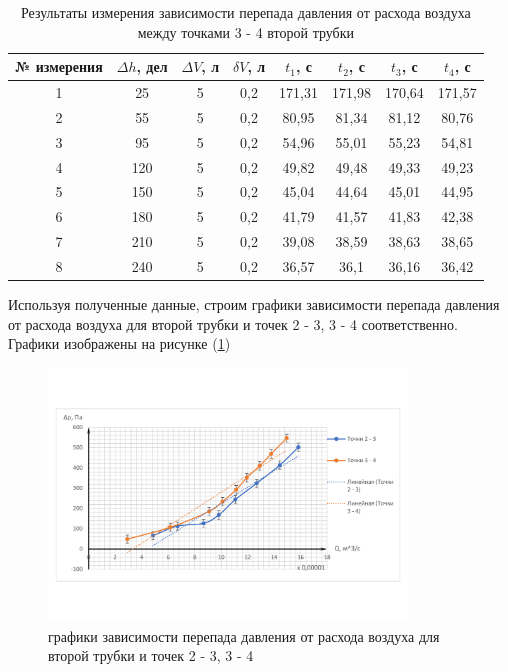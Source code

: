 \documentclass[12pt,a4paper]{article}
\begin{document}
\begin{table}[h!]
\centering
\begin{tabular}{|c|c|c|c|c|c|c|c|}
\hline
№ измерения & $\Delta h$, дел & $\Delta V$, л & $\delta V$, л & $t_{1}$, с & $t_{2}$, с & $t_{3}$, с & $t_{4}$, с \\ \hline
1           & 25              & 5             & 0,2           & 171,31     & 171,98     & 170,64     & 171,57     \\ \hline
2           & 55              & 5             & 0,2           & 80,95      & 81,34      & 81,12      & 80,76      \\ \hline
3           & 95              & 5             & 0,2           & 54,96      & 55,01      & 55,23      & 54,81      \\ \hline
4           & 120             & 5             & 0,2           & 49,82      & 49,48      & 49,33      & 49,23      \\ \hline
5           & 150             & 5             & 0,2           & 45,04      & 44,64      & 45,01      & 44,95      \\ \hline
6           & 180             & 5             & 0,2           & 41,79      & 41,57      & 41,83      & 42,38      \\ \hline
7           & 210             & 5             & 0,2           & 39,08      & 38,59      & 38,63      & 38,65      \\ \hline
8           & 240             & 5             & 0,2           & 36,57      & 36,1       & 36,16      & 36,42      \\ \hline
\end{tabular}
\caption{Результаты измерения зависимости перепада давления от расхода воздуха между точками 3 - 4 второй трубки}
\label{tab:flow_measuring_3_4_second_tube}
\end{table}

Используя полученные данные, строим графики зависимости перепада давления от расхода воздуха для второй трубки и точек 2 - 3, 3 - 4 соответственно. Графики изображены на рисунке (\ref{fig:graph_1})

\begin{figure}[h!]
	\begin{center}
		\includegraphics[width = 0.85\textwidth]{Results_of_measuring.pdf}
		\caption{графики зависимости перепада давления от расхода воздуха для второй трубки и точек 2 - 3, 3 - 4}
		\label{fig:graph_1}
	\end{center}
\end{figure}
\end{document}

